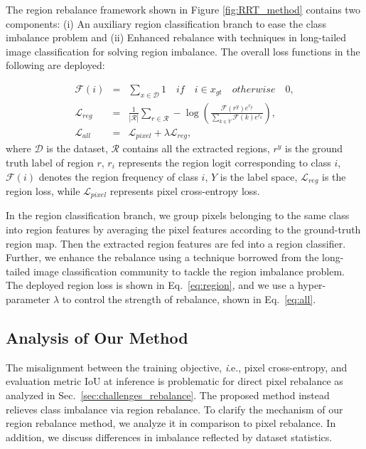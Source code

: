 \documentclass[final]{cvpr}
\begin{document}
The region rebalance framework shown in Figure \ref{fig:RRT_method} contains two components: 
(i) An auxiliary region classification branch to ease the class imbalance problem and (ii) Enhanced rebalance with techniques in long-tailed image classification for solving region imbalance. The overall loss functions in the following are deployed:

\vspace{-0.1in}
\begin{eqnarray}
   \mathcal{F}(i) \!&=&\! \sum_{x \in \mathcal{D}} 1 \!\quad\! if \!\quad\! i \in x_{gt} \!\quad\! otherwise \!\quad\! 0, \\
   \mathcal{L}_{reg} \!&=&\! \frac{1}{|\mathcal{R}|} \sum_{r \in \mathcal{R}} -\log(\frac{\mathcal{F}(r^{y}) e^{r_{y}} }{\sum_{k \in Y} \mathcal{F}(k) e^{r_{k}}}) \label{eq:region},\\
   \mathcal{L}_{all} \!&=&\! \mathcal{L}_{pixel} + \lambda \mathcal{L}_{reg} \label{eq:all},
\end{eqnarray}
where $\mathcal{D}$ is the dataset, $\mathcal{R}$ contains all the extracted regions, $r^{y}$ is the ground truth label of region $r$, $r_{i}$ represents the region logit corresponding to class $i$, $\mathcal{F}(i)$ denotes the region frequency of class $i$, $Y$ is the label space, $\mathcal{L}_{reg}$ is the region loss, while $\mathcal{L}_{pixel}$ represents pixel cross-entropy loss. 


In the region classification branch, we group pixels belonging to the same class into region features by averaging the pixel features according to the ground-truth region map. Then the extracted region features are fed into a region classifier.
Further, we enhance the rebalance using a technique \cite{DBLP:conf/nips/RenYSMZYL20} borrowed from the long-tailed image classification community to tackle the region imbalance problem. The deployed region loss is shown in Eq.~\eqref{eq:region}, and we use a hyper-parameter $\lambda$ to control the strength of rebalance, shown in Eq.~\eqref{eq:all}.


\subsection{Analysis of Our Method}
The misalignment between the training objective, {\textit i.e.}, pixel cross-entropy, and evaluation metric $\mathrm{IoU}$ at inference is problematic for direct pixel rebalance as analyzed in Sec.~\ref{sec:challenges_rebalance}. The proposed method instead relieves class imbalance via region rebalance. To clarify the mechanism of our region rebalance method, we analyze it in comparison to pixel rebalance. In addition, we discuss differences in imbalance reflected by dataset statistics.
\end{document}
